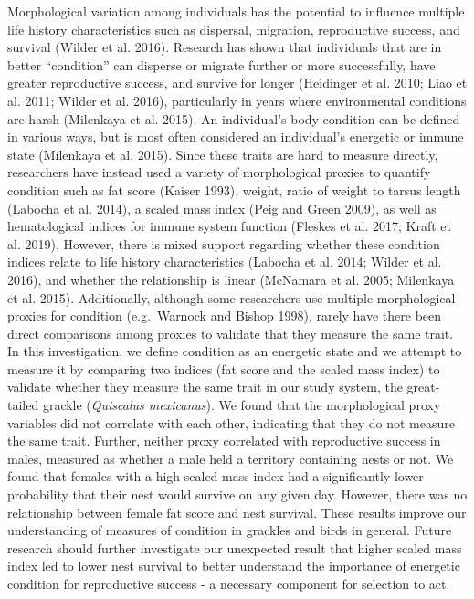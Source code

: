 \documentclass[
]{article}
\begin{document}
Morphological variation among individuals has the potential to influence
multiple life history characteristics such as dispersal, migration,
reproductive success, and survival (Wilder et al. 2016). Research has
shown that individuals that are in better ``condition'' can disperse or
migrate further or more successfully, have greater reproductive success,
and survive for longer (Heidinger et al. 2010; Liao et al. 2011; Wilder
et al. 2016), particularly in years where environmental conditions are
harsh (Milenkaya et al. 2015). An individual's body condition can be
defined in various ways, but is most often considered an individual's
energetic or immune state (Milenkaya et al. 2015). Since these traits
are hard to measure directly, researchers have instead used a variety of
morphological proxies to quantify condition such as fat score (Kaiser
1993), weight, ratio of weight to tarsus length (Labocha et al. 2014), a
scaled mass index (Peig and Green 2009), as well as hematological
indices for immune system function (Fleskes et al. 2017; Kraft et al.
2019). However, there is mixed support regarding whether these condition
indices relate to life history characteristics (Labocha et al. 2014;
Wilder et al. 2016), and whether the relationship is linear (McNamara et
al. 2005; Milenkaya et al. 2015). Additionally, although some
researchers use multiple morphological proxies for condition
(e.g.~Warnock and Bishop 1998), rarely have there been direct
comparisons among proxies to validate that they measure the same trait.
In this investigation, we define condition as an energetic state and we
attempt to measure it by comparing two indices (fat score and the scaled
mass index) to validate whether they measure the same trait in our study
system, the great-tailed grackle (\emph{Quiscalus mexicanus}). We found
that the morphological proxy variables did not correlate with each
other, indicating that they do not measure the same trait. Further,
neither proxy correlated with reproductive success in males, measured as
whether a male held a territory containing nests or not. We found that
females with a high scaled mass index had a significantly lower
probability that their nest would survive on any given day. However,
there was no relationship between female fat score and nest survival.
These results improve our understanding of measures of condition in
grackles and birds in general. Future research should further
investigate our unexpected result that higher scaled mass index led to
lower nest survival to better understand the importance of energetic
condition for reproductive success - a necessary component for selection
to act.
\end{document}
